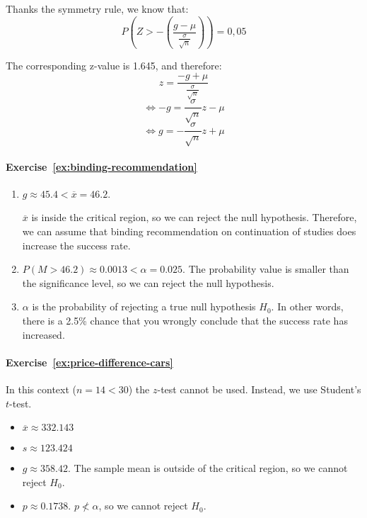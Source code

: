 Thanks the symmetry rule, we know that:
\[ P\left(Z > - \left( \frac{g - \mu}{\frac{\sigma}{\sqrt{n}}} \right) \right) = 0,05 \]

The corresponding z-value is 1.645, and therefore:
\[ z = \frac{-g + \mu}{\frac{\sigma}{\sqrt{n}}} \]
\[ \Leftrightarrow -g = \frac{\sigma}{\sqrt{n}} z - \mu \]
\[ \Leftrightarrow g = -\frac{\sigma}{\sqrt{n}} z + \mu \]

\paragraph{Exercise~\ref{ex:binding-recommendation}}

\begin{enumerate}
  \item $g \approx 45.4 < \overline{x} = 46.2$.
  
  $\overline{x}$ is inside the critical region, so we can reject the null hypothesis. Therefore, we can assume that binding recommendation on continuation of studies does increase the success rate.
  
  \item $P(M > 46.2) \approx 0.0013 < \alpha = 0.025$. The probability value is smaller than the significance level, so we can reject the null hypothesis.
  
  \item  $\alpha$ is the probability of rejecting a true null hypothesis $H_{0}$. In other words, there is a 2.5\% chance that you wrongly conclude that the success rate has increased.
\end{enumerate}

\paragraph{Exercise~\ref{ex:price-difference-cars}}

In this context ($n = 14 < 30$) the $z$-test cannot be used. Instead, we use Student's $t$-test.

\begin{itemize}
  \item $\overline{x} \approx 332.143$
  \item $s \approx 123.424$
  \item $g \approx 358.42$. The sample mean is outside of the critical region, so we cannot reject $H_0$.
  \item $p \approx 0.1738$. $p \nless \alpha$, so we cannot reject $H_0$.
\end{itemize}

